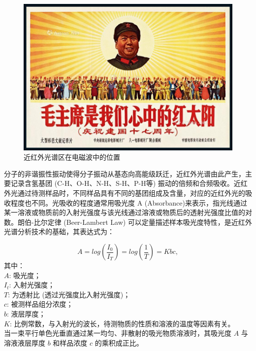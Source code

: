 \documentclass[UTF8]{ctexart}
\begin{document}
\begin{figure}[htbp]
	\centering
	\includegraphics[width=1.0\linewidth]{sunlights.jpg}
	\caption{近红外光谱区在电磁波中的位置}
	\label{fig:22}
\end{figure}

分子的非谐振性振动使得分子振动从基态向高能级跃迁，近红外光谱由此产生，主要记录含氢基团 (C-H、O-H、N-H、S-H、P-H等) 振动的倍频和合频吸收。近红外光通过待测样品时，不同样品具有不同的基团组成及含量，对应的近红外光的吸收程度也不同。光吸收的程度通常用吸光度 A (Absorbance)来表示，指光线通过某一溶液或物质前的入射光强度与该光线通过溶液或物质后的透射光强度比值的对数。朗伯-比尔定律 (Beer-Lambert Law) 可以定量描述样本吸光度特性，是近红外光谱分析技术的基础，其表达式为：\par

\begin{equation}
	 A= log\left( \frac{I_{0} }{I_T}\right ) =log\left( {\frac{1}{T} } \right )= Kbc,
\end{equation}
其中：\\
$ A $: 吸光度；\\
$ I_{t} $: 入射光强度；\\
$ T $: 为透射比 (透过光强度比入射光强度)；\\
$ c $: 被测样品组分浓度；\\
$ b $: 液层厚度；\\
$ K $: 比例常数，与入射光的波长，待测物质的性质和溶液的温度等因素有关。 \\

当一束平行单色光垂直通过某一均匀、非散射的吸光物质溶液时，其吸光度 $ A $ 与溶液液层厚度 $ b $ 和样品浓度 $ c $ 的乘积成正比。\par
\end{document}
